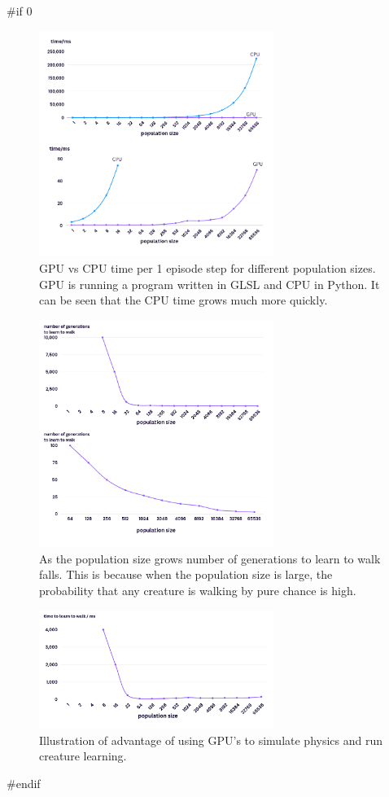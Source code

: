 #if 0
\begin{figure}[H]
    \includegraphics[width=3in]{popsizetime.png} %
    \caption{GPU vs CPU time per 1 episode step for different population sizes. GPU is running a program written in GLSL and CPU in Python. It can be seen that the CPU time grows much more quickly.}
    \label{fig:struktura} %
\end{figure}

\begin{figure}[H]
    \includegraphics[width=3in]{numberofgenerationstolearntowalk.png} %
    \caption{As the population size grows number of generations to learn to walk falls. This is because when the population size is large, the probability that any creature is walking by pure chance is high.}
    \label{fig:struktura} %
\end{figure}

\begin{figure}[H]
    \includegraphics[width=3in]{resources/timetolearntowalk.png} %
    \caption{Illustration of advantage of using GPU's to simulate physics and run creature learning.}
    \label{fig:struktura} %
\end{figure}
#endif